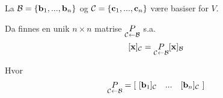La $\Basis$ og $\Casis$ være basiser for $V$.

Da finnes en unik $n\times n$ matrise $\underset{\C\gets\B}{P}$ s.a.
$$[\vecx]_\C = \underset{\C\gets\B}{P} [\vecx]_\B$$

Hvor
$$\underset{\C\gets\B}{P} = [\ [\vecb_1]_\C\quad ...\quad [\vecb_n]_\C\ ]$$
